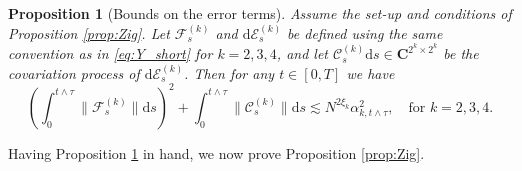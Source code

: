 \documentclass[10pt]{amsart}
\newtheorem{proposition}[theorem]{Proposition}
\numberwithin{equation}{section}
\newcommand{\dif}{\mathrm{d}}
\newcommand{\C}{\mathbf{C}}
\begin{document}
\begin{proposition}[Bounds on the error terms]\label{prop:err_bounds} Assume the set-up and conditions of Proposition \ref{prop:Zig}. Let $\mathcal{F}^{(k)}_s$ and $\dif\mathcal{E}^{(k)}_s$ be defined using the same convention as in \eqref{eq:Y_short} for $k=2,3,4$, and let $\mathcal{C}^{(k)}_s\dif s\in\C^{2^k\times 2^k}$ be the covariation process of $\dif\mathcal{E}^{(k)}_s$. Then for any $t\in [0,T]$ we have
\begin{equation}
\left(\int_0^{t\wedge\tau}\|\mathcal{F}_s^{(k)}\|\dif s\right)^2 +\int_0^{t\wedge\tau} \|\mathcal{C}^{(k)}_s\|\dif s \lesssim  N^{2\xi_k}\alpha_{k,t\wedge\tau}^2,\quad \text{for}\,\, k=2,3,4.
\label{eq:err_bounds}
\end{equation}
\end{proposition}
Having Proposition \ref{prop:err_bounds} in hand, we now prove Proposition \ref{prop:Zig}.
\end{document}
